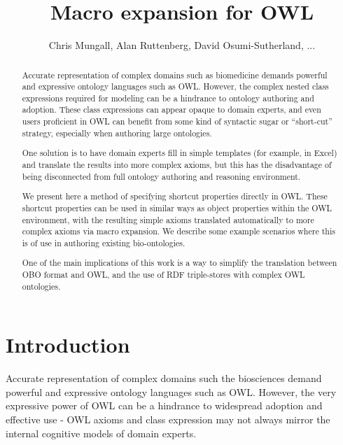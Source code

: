 \documentclass{llncs}
\begin{document}
%
\frontmatter          %

\title{Macro expansion for OWL}

\author{Chris Mungall, Alan Ruttenberg, David Osumi-Sutherland, ...}

\institute{}

\maketitle              %

\begin{abstract}

Accurate representation of complex domains such as biomedicine demands
powerful and expressive ontology languages such as OWL. However, the
complex nested class expressions required for modeling can be a
hindrance to ontology authoring and adoption. These class expressions
can appear opaque to domain experts, and even users proficient in OWL
can benefit from some kind of syntactic sugar or ``short-cut''
strategy, especially when authoring large ontologies.

One solution is to have domain experts fill in simple templates (for
example, in Excel) and translate the results into more complex axioms,
but this has the disadvantage of being disconnected from full ontology
authoring and reasoning environment.

We present here a method of specifying shortcut properties directly in
OWL. These shortcut properties can be used in similar ways as object
properties within the OWL environment, with the resulting simple
axioms translated automatically to more complex axioms via macro
expansion. We describe some example scenarios where this is of use in
authoring existing bio-ontologies.

One of the main implications of this work is a way to simplify the
translation between OBO format and OWL, and the use of RDF
triple-stores with complex OWL ontologies.

\end{abstract}

\section{Introduction}


Accurate representation of complex domains such the biosciences demand
powerful and expressive ontology languages such as OWL. However, the
very expressive power of OWL can be a hindrance to widespread adoption
and effective use - OWL axioms and class expression may not always
mirror the internal cognitive models of domain experts. 
\end{document}
